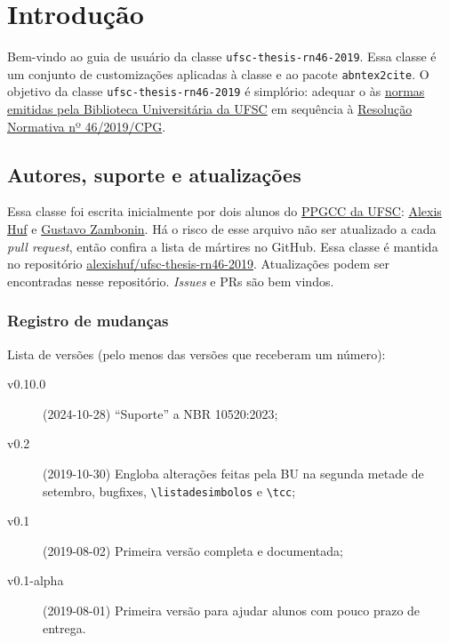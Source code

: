 \documentclass[embeddedlogo]{ufsc-thesis-rn46-2019}
\newcommand{\lacmd}[1]{\texttt{\textbackslash{}#1}}
\begin{document}
\tableofcontents*%

\textual%

\chapter{Introdução}

Bem-vindo ao guia de usuário da classe \texttt{ufsc-thesis-rn46-2019}. Essa
classe é um conjunto de customizações aplicadas à classe
\href{https://ctan.org/pkg/abntex2}{\abnTeX} e ao pacote \texttt{abntex2cite}.
O objetivo da classe \texttt{ufsc-thesis-rn46-2019} é simplório: adequar o
\abnTeX{} às \href{http://portal.bu.ufsc.br/normalizacao/}{normas emitidas pela
Biblioteca Universitária da UFSC} em sequência à
\href{https://repositorio.ufsc.br/handle/123456789/197121}{Resolução Normativa
nº 46/2019/CPG}.


\section{Autores, suporte e atualizações}

Essa classe foi escrita inicialmente por dois alunos do
\href{http://ppgcc.posgrad.ufsc.br/}{PPGCC da UFSC}:
\href{mailto:alexishuf@gmail.com}{Alexis Huf} e
\href{mailto:gustavo.zambonin@posgrad.ufsc.br}{Gustavo Zambonin}.  Há o risco de
esse arquivo não ser atualizado a cada \textit{pull request}, então confira a
lista de mártires no GitHub. Essa classe é mantida no repositório
\href{https://github.com/alexishuf/ufsc-thesis-rn46-2019/}{alexishuf/ufsc-thesis-rn46-2019}.
Atualizações podem ser encontradas nesse repositório. \textit{Issues} e PRs são
bem vindos.

\subsection{Registro de mudanças}

Lista de versões (pelo menos das versões que receberam um número):
\begin{description}
  \item[v0.10.0] (2024-10-28) ``Suporte'' a NBR 10520:2023;
\item[v0.2] (2019-10-30) Engloba alterações feitas pela BU na segunda metade de
  setembro, bugfixes, \lacmd{listadesimbolos} e \lacmd{tcc};
\item[v0.1] (2019-08-02) Primeira versão completa e documentada;
\item[v0.1-alpha] (2019-08-01) Primeira versão para ajudar alunos com pouco
    prazo de entrega.
\end{description}
\end{document}

